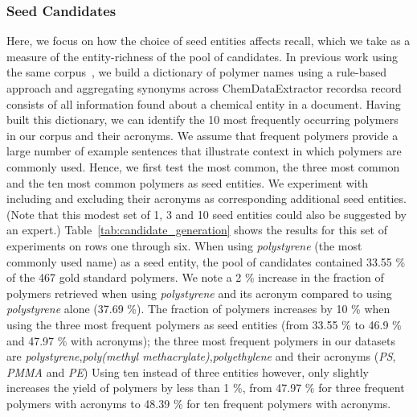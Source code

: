 \subsubsection{Seed Candidates}
Here, we focus on how the choice of seed entities affects recall, which we take as a measure of the entity-richness of the pool of candidates.
In previous work using the same corpus~\cite{tchoua2016hybrid,tchoua2016hybridi}, we build a dictionary of polymer names using a rule-based approach and aggregating synonyms across ChemDataExtractor records\textemdash a record consists of all information found about a chemical entity in a document.  
Having built this dictionary, we can identify the 10 most frequently occurring polymers in our corpus and their acronyms.
We assume that frequent polymers provide a large number of example sentences that illustrate context in which polymers are commonly used.
Hence, we first test the most common, the three most common and the ten most common polymers as seed entities.
We experiment with including and excluding their acronyms as corresponding additional seed entities.
(Note that this modest set of 1, 3 and 10 seed entities could also be suggested by an expert.)
Table~\ref{tab:candidate_generation} shows the results for this set of experiments on rows one through six.
When using \textit{polystyrene} (the most commonly used name) as a seed entity, the pool of candidates contained 33.55 \% of the 467 gold standard polymers.
We note a 2 \% increase in the fraction of polymers retrieved when using \textit{polystyrene} and its acronym compared to using \textit{polystyrene} alone (37.69 \%).
The fraction of polymers increases by 10 \% when using the three most frequent polymers as seed entities (from 33.55 \% to 46.9 \% and 47.97 \% with acronyms); the three most frequent polymers in our datasets are \textit{polystyrene},\textit{poly(methyl methacrylate)},\textit{polyethylene} and their acronyms (\textit{PS}, \textit{PMMA} and \textit{PE})
Using ten instead of three entities however, only slightly increases the yield of polymers by less than 1 \%, from 47.97 \% for three frequent polymers with acronyms to 48.39 \% for ten frequent polymers with acronyms.

